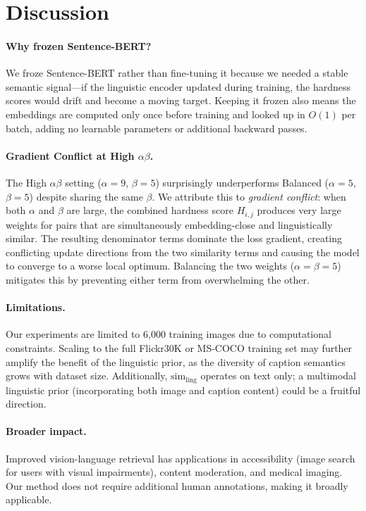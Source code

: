 \documentclass[10pt,twocolumn,letterpaper]{article}
\begin{document}
\section{Discussion}
\label{sec:discussion}

\paragraph{Why frozen Sentence-BERT?}
We froze Sentence-BERT rather than fine-tuning it because we needed a stable semantic signal---if the linguistic encoder updated during training, the hardness scores would drift and become a moving target.
Keeping it frozen also means the embeddings are computed only once before training and looked up in $O(1)$ per batch, adding no learnable parameters or additional backward passes.

\paragraph{Gradient Conflict at High $\alpha\beta$.}
The High $\alpha\beta$ setting ($\alpha{=}9$, $\beta{=}5$) surprisingly underperforms Balanced ($\alpha{=}5$, $\beta{=}5$) despite sharing the same $\beta$.
We attribute this to \emph{gradient conflict}: when both $\alpha$ and $\beta$ are large, the combined hardness score $H_{i,j}$ produces very large weights for pairs that are simultaneously embedding-close and linguistically similar.
The resulting denominator terms dominate the loss gradient, creating conflicting update directions from the two similarity terms and causing the model to converge to a worse local optimum.
Balancing the two weights ($\alpha{=}\beta{=}5$) mitigates this by preventing either term from overwhelming the other.

\paragraph{Limitations.}
Our experiments are limited to 6,000 training images due to computational constraints.
Scaling to the full Flickr30K or MS-COCO training set may further amplify the benefit of the linguistic prior, as the diversity of caption semantics grows with dataset size.
Additionally, $\mathrm{sim}_\mathrm{ling}$ operates on text only; a multimodal linguistic prior (incorporating both image and caption content) could be a fruitful direction.

\paragraph{Broader impact.}
Improved vision-language retrieval has applications in accessibility (image search for users with visual impairments), content moderation, and medical imaging.
Our method does not require additional human annotations, making it broadly applicable.
\end{document}
